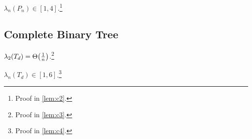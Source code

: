 \begin{lem}
$\lambda_n(P_n) \in [1,4]$.\footnote{Proof in \cref{lem:c2}.}
\end{lem}

\subsection{Complete Binary Tree}

\begin{lem}
$\lambda_2(T_d) = \Theta\parentheses*{\frac{1}{n}}$.\footnote{Proof in \cref{lem:c3}.}
\end{lem}

\begin{lem}
$\lambda_n(T_d) \in [1,6]$.\footnote{Proof in \cref{lem:c4}.}
\end{lem}